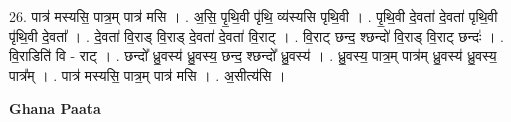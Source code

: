 \documentclass[17pt]{extarticle}
\begin{document}
26. पात्र॑ मस्यसि॒ पात्र॒म् पात्र॑ मसि । . अ॒सि॒ पृ॒थि॒वी पृ॑थि॒ व्य॑स्यसि पृथि॒वी । . पृ॒थि॒वी दे॒वता॑ दे॒वता॑ पृथि॒वी पृ॑थि॒वी दे॒वता᳚ । . दे॒वता॑ वि॒राड् वि॒राड् दे॒वता॑ दे॒वता॑ वि॒राट् । . वि॒राट् छन्द॒ श्छन्दो॑ वि॒राड् वि॒राट् छन्दः॑ । . वि॒राडिति॑ वि - राट् । . छन्दो᳚ ध्रु॒वस्य॑ ध्रु॒वस्य॒ छन्द॒ श्छन्दो᳚ ध्रु॒वस्य॑ । . ध्रु॒वस्य॒ पात्र॒म् पात्र॑म् ध्रु॒वस्य॑ ध्रु॒वस्य॒ पात्र᳚म् । . पात्र॑ मस्यसि॒ पात्र॒म् पात्र॑ मसि । . अ॒सीत्य॑सि । \newline

\textbf{Ghana Paata } \newline
\end{document}
